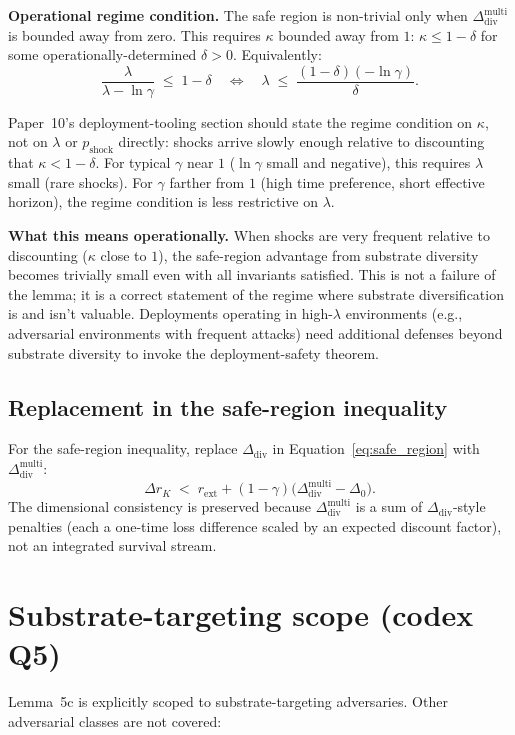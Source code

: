 \documentclass{article}
\newcommand{\rext}{r_{\mathrm{ext}}}
\newcommand{\Ddiv}{\Delta_{\mathrm{div}}}
\newcommand{\pshock}{p_{\mathrm{shock}}}
\begin{document}
\textbf{Operational regime condition.}  The safe region is
non-trivial only when $\Ddiv^{\mathrm{multi}}$ is bounded away from
zero.  This requires $\kappa$ bounded away from $1$:
$\kappa \leq 1 - \delta$ for some operationally-determined
$\delta > 0$.  Equivalently:
\[
  \frac{\lambda}{\lambda - \ln \gamma} \;\leq\; 1 - \delta
  \quad\Leftrightarrow\quad
  \lambda \;\leq\; \frac{(1-\delta)(- \ln \gamma)}{\delta}.
\]

Paper~10's deployment-tooling section should state the regime
condition on $\kappa$, not on $\lambda$ or $\pshock$ directly:
shocks arrive slowly enough relative to discounting that
$\kappa < 1 - \delta$.  For typical $\gamma$ near $1$ ($\ln \gamma$
small and negative), this requires $\lambda$ small (rare shocks).
For $\gamma$ farther from $1$ (high time preference, short effective
horizon), the regime condition is less restrictive on $\lambda$.

\textbf{What this means operationally.}  When shocks are very
frequent relative to discounting ($\kappa$ close to $1$), the
safe-region advantage from substrate diversity becomes trivially
small even with all invariants satisfied.  This is not a failure of
the lemma; it is a correct statement of the regime where substrate
diversification is and isn't valuable.  Deployments operating in
high-$\lambda$ environments (e.g., adversarial environments with
frequent attacks) need additional defenses beyond substrate
diversity to invoke the deployment-safety theorem.

\subsection{Replacement in the safe-region inequality}

For the safe-region inequality, replace $\Ddiv$ in
Equation~\ref{eq:safe_region} with $\Ddiv^{\mathrm{multi}}$:
\[
  \Delta r_K \;<\; \rext + (1 - \gamma)\bigl(\Ddiv^{\mathrm{multi}}
  - \Delta_0\bigr).
\]
The dimensional consistency is preserved because
$\Ddiv^{\mathrm{multi}}$ is a sum of $\Ddiv$-style penalties (each a
one-time loss difference scaled by an expected discount factor), not
an integrated survival stream.

\section{Substrate-targeting scope (codex Q5)}

Lemma~5c is explicitly scoped to substrate-targeting adversaries.
Other adversarial classes are not covered:
\end{document}
